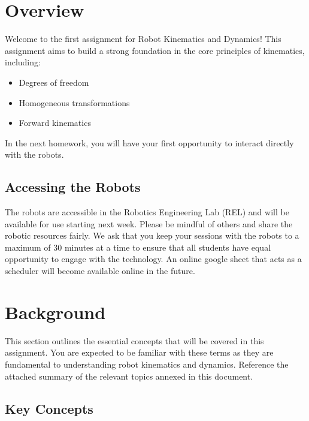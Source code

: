 \documentclass{16384_doc}
\begin{document}
\maketitle

\tableofcontents

\section{Overview}
Welcome to the first assignment for Robot Kinematics and Dynamics! This assignment aims to build a strong foundation in the core principles of kinematics, including:

\begin{itemize}
\item Degrees of freedom
\item Homogeneous transformations
\item Forward kinematics
\end{itemize}

In the next homework, you will have your first opportunity to interact directly with the robots. 

\subsection{Accessing the Robots}

The robots are accessible in the Robotics Engineering Lab (REL) and will be available for use starting next week. Please be mindful of others and share the robotic resources fairly. We ask that you keep your sessions with the robots to a maximum of 30 minutes at a time to ensure that all students have equal opportunity to engage with the technology. An online google sheet that acts as a scheduler will become available online in the future.

\section{Background}

This section outlines the essential concepts that will be covered in this assignment. You are expected to be familiar with these terms as they are fundamental to understanding robot kinematics and dynamics. Reference the attached summary of the relevant topics annexed in this document. 

\subsection{Key Concepts}
\end{document}
